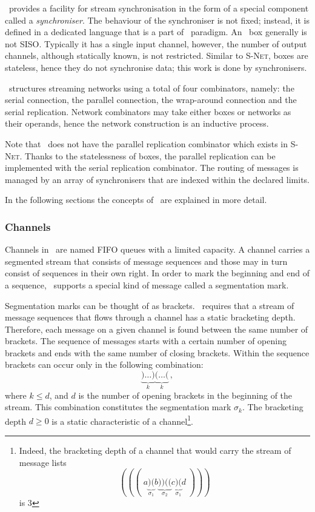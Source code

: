 \ak\ provides a facility for stream synchronisation in the form of a special component called a \emph{synchroniser}. The behaviour of the synchroniser is not fixed; instead, it is defined in a dedicated language that is a part of \ak\ paradigm. An \ak\ box generally is not SISO. Typically it has a single input channel, however, the number of output channels, although statically known, is not restricted. Similar to \textsc{S-Net}, boxes are stateless, hence they do not synchronise data; this work is done by synchronisers.

\ak\ structures streaming networks using a total of four combinators, namely: the serial connection, the parallel connection, the wrap-around connection and the serial replication. Network combinators may take either boxes or networks as their operands, hence the network construction is an inductive process. 

Note that \ak\ does not have the parallel replication combinator which exists in \textsc{S-Net}. Thanks to the statelessness of boxes, the parallel replication can be implemented with the serial replication combinator. The routing of messages is managed by an array of synchronisers that are indexed within the declared limits.

In the following sections the concepts of \ak\ are explained in more detail.


    \subsubsection*{Channels}
Channels in \ak\ are named FIFO queues with a limited capacity. A channel carries a segmented stream that consists of message sequences and those may in turn consist of sequences in their own right. In order to mark the beginning and end of a sequence, \ak\ supports a special kind of message called a segmentation mark.

Segmentation marks can be thought of as brackets. \ak\ requires that a stream of message sequences that flows through a channel has a static bracketing depth. Therefore, each message on a given channel is found between the same number of brackets. The sequence of messages starts with a certain number of opening brackets and ends with the same number of closing brackets. Within the sequence brackets can occur only in the following combination:
\[
\underbrace{)\ldots)}_k \underbrace{(\ldots(}_k\,,
\]
where $k \le d$, and $d$ is the number of opening brackets in the beginning of the stream. This combination constitutes the segmentation mark $\sigma_k$. The bracketing depth $d \ge 0$ is a static characteristic of a channel\footnote{Indeed, the bracketing depth of a channel that would carry the stream of message lists
\[
(((\;a\underbrace{)(}_{\sigma_1}b\underbrace{))((}_{\sigma_2}c\underbrace{)(}_{\sigma_1}d\;)))
\]
is 3}.


